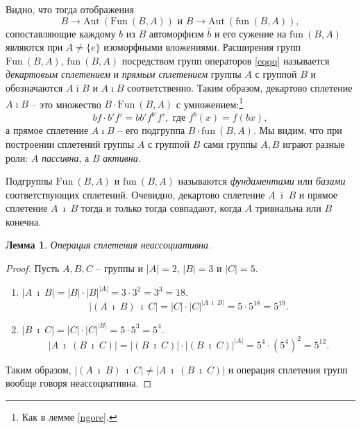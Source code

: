 \documentclass{article}
\newtheorem{lemma}{Лемма}[section]
\begin{document}
Видно, что тогда отображения
\begin{equation} \tag{*} \label{eqqq}
    B \rightarrow \mathrm{Aut} \ (\mathrm{Fun} \ (B, A)) \text{ и } B \rightarrow \mathrm{Aut} \ (\mathrm{fun} \ (B, A)),
\end{equation}
сопоставляющие каждому $b$ из $B$ автоморфизм $\hat{b}$ и его сужение на $\mathrm{fun} \ (B, A)$ являются при $A \neq \{ e \}$ изоморфными вложениями. Расширения групп $\mathrm{Fun} \ (B, A)$, $ \mathrm{fun} \ (B, A)$ посредством групп операторов \eqref{eqqq} называется \textit{декартовым сплетением} и \textit{прямым сплетением} группы $A$ с группой $B$ и обозначаются $A \overline{\imath} B$ и $A \imath B$ соответственно. Таким образом, декартово сплетение $A \imath B$ -- это множество $B \cdot \mathrm{Fun} \ (B, A)$ с умножением:\footnote{Как в лемме \ref{ngore}.}
\[
    bf \cdot b' f' = b b' f^{b'} f', \text{ где } f^b(x) = f(bx),
\]
а прямое сплетение $A \imath B$ -- его подгруппа $B \cdot \mathrm{fun} \ (B, A)$. Мы видим, что при построении сплетений группы $A$ с группой $B$ сами группы $A, B$ играют разные роли: $A$ \textit{пассивна}, а $B$ \textit{активна}.

Подгруппы $\mathrm{Fun} \ (B, A)$ и $\mathrm{fun} \ (B, A)$ называются \textit{фундаментами} или \textit{базами} соответствующих сплетений. Очевидно, декартово сплетение $A \ \overline{\imath} \ B$ и прямое сплетение $A \ \imath \ B$ тогда и только тогда совпадают, когда $A$ тривиальна или $B$ конечна.

\begin{lemma}
    Операция сплетения неассоциативна.
\end{lemma}
\begin{proof}
    Пусть $A, B, C$ -- группы и $|A| = 2$, $|B| = 3$ и $|C| = 5$.
    \begin{enumerate}
        \item $|A \ \imath \ B| = |B| \cdot |B|^{|A|} = 3 \cdot 3^2 = 3^3 = 18$. $$|(A \ \imath \ B) \ \imath \ C| = |C| \cdot |C|^{|A \ \imath \ B|} = 5 \cdot 5^{18} = 5^{19}.$$
        
        \item $|B \ \imath \ C| = |C| \cdot |C|^{|B|} = 5 \cdot 5^3 = 5^4.$ $$ |A \ \imath \ (B \ \imath \ C)| = |(B \ \imath \ C)| \cdot |(B \ \imath \ C)|^{|A|} = 5^4 \cdot (5^4)^2 = 5^{12}. $$
    \end{enumerate}
    Таким образом, $|(A \ \imath \ B) \ \imath \ C| \neq |A \ \imath \ (B \ \imath \ C)|$ и операция сплетения групп вообще говоря неассоциативна.
\end{proof}
\end{document}
